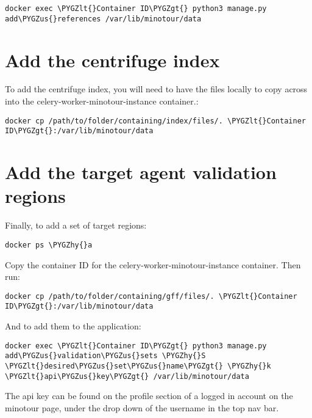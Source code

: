 \documentclass[letterpaper,10pt,english]{sphinxmanual}
\def\PYGZus{\char`\_}
\def\PYGZlt{\char`\<}
\def\PYGZgt{\char`\>}
\def\PYGZhy{\char`\-}
\begin{document}
\begin{Verbatim}[commandchars=\\\{\}]
docker exec \PYGZlt{}Container ID\PYGZgt{} python3 manage.py add\PYGZus{}references /var/lib/minotour/data
\end{Verbatim}


\section{Add the centrifuge index}
\label{docker:add-the-centrifuge-index}
To add the centrifuge index, you will need to have the files locally to copy across into the celery-worker-minotour-instance container.:

\begin{Verbatim}[commandchars=\\\{\}]
docker cp /path/to/folder/containing/index/files/. \PYGZlt{}Container ID\PYGZgt{}:/var/lib/minotour/data
\end{Verbatim}


\section{Add the target agent validation regions}
\label{docker:add-the-target-agent-validation-regions}
Finally, to add a set of target regions:

\begin{Verbatim}[commandchars=\\\{\}]
docker ps \PYGZhy{}a
\end{Verbatim}

Copy the container ID for the celery-worker-minotour-instance container. Then run:

\begin{Verbatim}[commandchars=\\\{\}]
docker cp /path/to/folder/containing/gff/files/. \PYGZlt{}Container ID\PYGZgt{}:/var/lib/minotour/data
\end{Verbatim}

And to add them to the application:

\begin{Verbatim}[commandchars=\\\{\}]
docker exec \PYGZlt{}Container ID\PYGZgt{} python3 manage.py add\PYGZus{}validation\PYGZus{}sets \PYGZhy{}S \PYGZlt{}desired\PYGZus{}set\PYGZus{}name\PYGZgt{} \PYGZhy{}k \PYGZlt{}api\PYGZus{}key\PYGZgt{} /var/lib/minotour/data
\end{Verbatim}

The api key can be found on the profile section of a logged in account on the minotour page, under the drop down of the username in the top nav bar.
\end{document}

